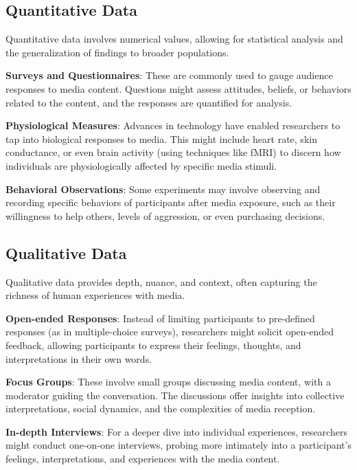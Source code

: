 \documentclass[
  b5paper]{book}
\begin{document}
\hypertarget{quantitative-data}{%
\subsection*{Quantitative Data}\label{quantitative-data}}

Quantitative data involves numerical values, allowing for statistical analysis and the generalization of findings to broader populations.

\textbf{Surveys and Questionnaires}: These are commonly used to gauge audience responses to media content. Questions might assess attitudes, beliefs, or behaviors related to the content, and the responses are quantified for analysis.

\textbf{Physiological Measures}: Advances in technology have enabled researchers to tap into biological responses to media. This might include heart rate, skin conductance, or even brain activity (using techniques like fMRI) to discern how individuals are physiologically affected by specific media stimuli.

\textbf{Behavioral Observations}: Some experiments may involve observing and recording specific behaviors of participants after media exposure, such as their willingness to help others, levels of aggression, or even purchasing decisions.

\hypertarget{qualitative-data}{%
\subsection*{Qualitative Data}\label{qualitative-data}}

Qualitative data provides depth, nuance, and context, often capturing the richness of human experiences with media.

\textbf{Open-ended Responses}: Instead of limiting participants to pre-defined responses (as in multiple-choice surveys), researchers might solicit open-ended feedback, allowing participants to express their feelings, thoughts, and interpretations in their own words.

\textbf{Focus Groups}: These involve small groups discussing media content, with a moderator guiding the conversation. The discussions offer insights into collective interpretations, social dynamics, and the complexities of media reception.

\textbf{In-depth Interviews}: For a deeper dive into individual experiences, researchers might conduct one-on-one interviews, probing more intimately into a participant's feelings, interpretations, and experiences with the media content.
\end{document}
